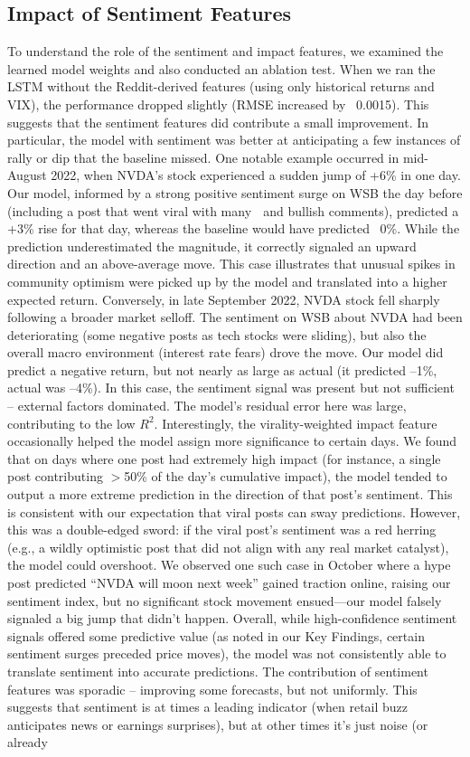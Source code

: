 \documentclass[conference]{IEEEtran}
\begin{document}
\subsection{Impact of Sentiment Features}
To understand the role of the sentiment and impact features, we examined the learned model weights and also conducted an ablation test. When we ran the LSTM without the Reddit-derived features (using only historical returns and VIX), the performance dropped slightly (RMSE increased by ~0.0015). This suggests that the sentiment features did contribute a small improvement. In particular, the model with sentiment was better at anticipating a few instances of rally or dip that the baseline missed. One notable example occurred in mid-August 2022, when NVDA’s stock experienced a sudden jump of +6\% in one day. Our model, informed by a strong positive sentiment surge on WSB the day before (including a post that went viral with many {\emojifont 🚀} and bullish comments), predicted a +3\% rise for that day, whereas the baseline would have predicted ~0\%. While the prediction underestimated the magnitude, it correctly signaled an upward direction and an above-average move. This case illustrates that unusual spikes in community optimism were picked up by the model and translated into a higher expected return. Conversely, in late September 2022, NVDA stock fell sharply following a broader market selloff. The sentiment on WSB about NVDA had been deteriorating (some negative posts as tech stocks were sliding), but also the overall macro environment (interest rate fears) drove the move. Our model did predict a negative return, but not nearly as large as actual (it predicted --1\%, actual was --4\%). In this case, the sentiment signal was present but not sufficient -- external factors dominated. The model’s residual error here was large, contributing to the low $R^2$. Interestingly, the virality-weighted impact feature occasionally helped the model assign more significance to certain days. We found that on days where one post had extremely high impact (for instance, a single post contributing $>$50\% of the day’s cumulative impact), the model tended to output a more extreme prediction in the direction of that post’s sentiment. This is consistent with our expectation that viral posts can sway predictions. However, this was a double-edged sword: if the viral post’s sentiment was a red herring (e.g., a wildly optimistic post that did not align with any real market catalyst), the model could overshoot. We observed one such case in October where a hype post predicted “NVDA will moon next week” gained traction online, raising our sentiment index, but no significant stock movement ensued---our model falsely signaled a big jump that didn’t happen. Overall, while high-confidence sentiment signals offered some predictive value (as noted in our Key Findings, certain sentiment surges preceded price moves), the model was not consistently able to translate sentiment into accurate predictions. The contribution of sentiment features was sporadic -- improving some forecasts, but not uniformly. This suggests that sentiment is at times a leading indicator (when retail buzz anticipates news or earnings surprises), but at other times it’s just noise (or already 
\end{document}

